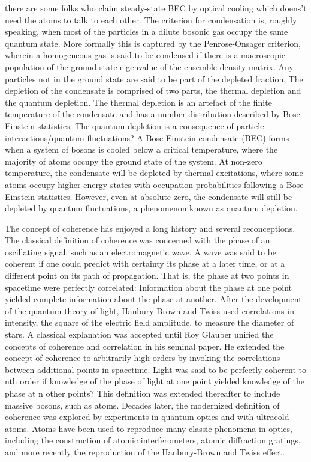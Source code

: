 	there are some folks who claim steady-state BEC by optical cooling which doens't need the atoms to talk to each other. 
	The criterion for condensation is, roughly speaking, when most of the particles in a dilute bosonic gas occupy the same quantum state. More formally this is captured by the Penrose-Onsager criterion, wherein a homogeneous gas is said to be condensed if there is a macroscopic population of the ground-state eigenvalue of the ensemble density matrix. Any particles not in the ground state are said to be part of the depleted fraction. The depletion of the condensate is comprised of two parts, the thermal depletion and the quantum depletion. The thermal depletion is an artefact of the finite temperature of the condensate and has a number distribution described by Bose-Einstein statistics. The quantum depletion is a consequence of particle interactions/quantum fluctuations?
	A Bose-Einstein condensate (BEC) forms when a system of bosons is cooled below a critical temperature, where the majority of atoms occupy the ground state of the system. At non-zero temperature, the condensate will be depleted by thermal excitations, where some atoms occupy higher energy states with occupation probabilities following a Bose-Einstein statistics. However, even at absolute zero, the condensate will still be depleted by quantum fluctuations, a phenomenon known as quantum depletion. 

	The concept of coherence has enjoyed a long history and several reconceptions. The classical definition of coherence was concerned with the phase of an oscillating signal, such as an electromagnetic wave. A wave was said to be coherent if one could predict with certainty its phase at a later time, or at a different point on its path of propagation. That is, the phase at two points in spacetime were perfectly correlated: Information about the phase at one point yielded complete information about the phase at another. After the development of the quantum theory of light, Hanbury-Brown and Twiss used correlations in intensity, the square of the electric field amplitude, to measure the diameter of stars. A classical explanation was accepted until Roy Glauber unified the concepts of coherence and correlation in his seminal paper. He extended the concept of coherence to arbitrarily high orders by invoking the correlations between additional points in spacetime. Light was said to be perfectly coherent to nth order if knowledge of the phase of light at one point yielded knowledge of the phase at n other points? This definition was extended thereafter to include massive bosons, such as atoms. Decades later, the modernized definition of coherence was explored by experiments in quantum optics and with ultracold atoms. Atoms have been used to reproduce many classic phenomena in optics, including the construction of atomic interferometers, atomic diffraction gratings, and more recently the reproduction of the Hanbury-Brown and Twiss effect.
	

